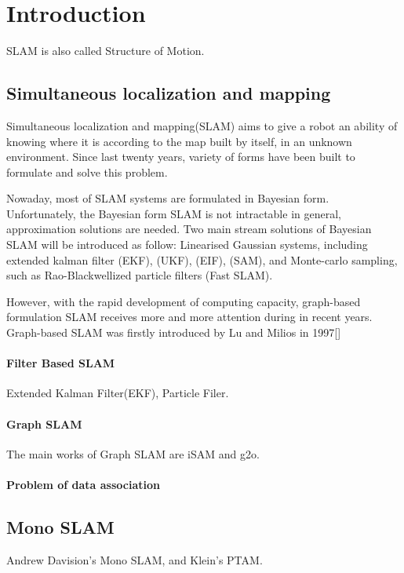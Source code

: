 \chapter{Introduction}
\label{cha:intro}
SLAM is also called Structure of Motion.

\section{Simultaneous localization and mapping}
Simultaneous localization and mapping(SLAM) aims to give a robot an ability of knowing where it is according to the map built by itself, in an unknown environment. Since last twenty years, variety of forms have been built to formulate and solve this problem.

Nowaday, most of SLAM systems are formulated in Bayesian form. Unfortunately, the Bayesian form SLAM is not intractable in general, approximation solutions are needed. Two main stream solutions of Bayesian SLAM will be introduced as follow: Linearised Gaussian systems, including extended kalman filter (EKF), (UKF), (EIF), (SAM), and Monte-carlo sampling, such as Rao-Blackwellized particle filters (Fast SLAM). 

However, with the rapid development of computing capacity, graph-based formulation SLAM receives more and more attention during in recent years. Graph-based SLAM was firstly introduced by Lu and Milios in 1997[]



\subsubsection{Filter Based SLAM}
Extended Kalman Filter(EKF), Particle Filer.
 
\subsubsection{Graph SLAM}
The main works of Graph SLAM are iSAM and g2o.

\subsubsection{Problem of data association}

\section{Mono SLAM}
Andrew Davision\rq{}s Mono SLAM, and  Klein\rq{}s PTAM.



